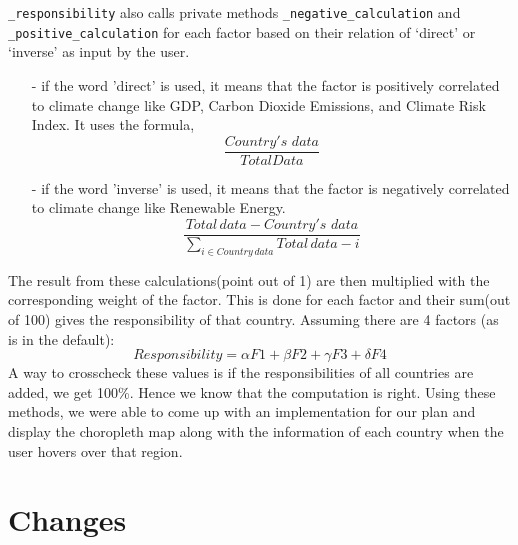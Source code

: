 \documentclass[fontsize=11pt]{article}
\begin{document}
    \texttt{\_responsibility} also calls private methods \texttt{\_negative\_calculation} and \texttt{\_positive\_calculation} for each factor based on
    their relation of ‘direct’ or ‘inverse’ as input by the user.\newline
    \begin{enumerate}
        \item [-] if the word 'direct' is used, it means that the factor is positively correlated to climate change like
        GDP, Carbon Dioxide Emissions, and Climate Risk Index. It uses the formula,
        \[
            \frac{Country's \, \, data}{Total Data}
        \]

        \item [-] if the word 'inverse' is used, it means that the factor is negatively correlated to climate change like
        Renewable Energy.
        \[
            \frac{Total \, data - Country's \, \, data}{\displaystyle\sum_{i \in Country \, data} Total \, data - i }
        \]
    \end{enumerate}
    The result from these calculations(point out of 1) are then multiplied with the corresponding weight of the factor.
    This is done for each factor and their sum(out of 100) gives the responsibility of that country. Assuming there are 4 factors (as is in the default):
    \[
        Responsibility = \alpha F1 + \beta F2 + \gamma F3 + \delta F4
    \]
    A way to crosscheck these values
    is if the responsibilities of all countries are added, we get 100\%. Hence we know that the computation is right.
    \newline
    Using these methods, we were able to come up with an implementation for our plan and display the
    choropleth map along with the information of each country when the user hovers over that region.\newline



    \section*{Changes}
\end{document}
